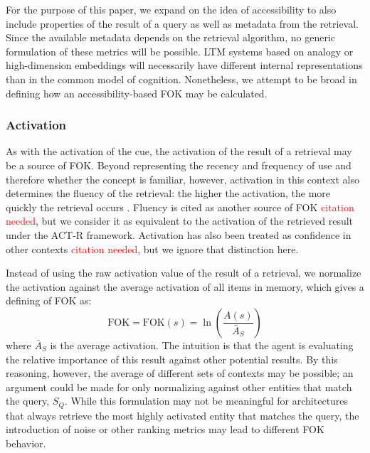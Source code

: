 \documentclass[10pt,letterpaper]{article}
\newcommand{\fixme}[2][]{#2}
\renewcommand{\fixme}[2][]{\textcolor{red}{#2}}
\newcommand{\fok}[0]{\text{FOK}}
\begin{document}
For the purpose of this paper, we expand on the idea of accessibility to also include properties of the result of a query as well as metadata from the retrieval.
Since the available metadata depends on the retrieval algorithm, no generic formulation of these metrics will be possible.
LTM systems based on analogy \cite{Forbus1995MACFACAModel} or high-dimension embeddings \cite{Kanerva1993SparseDistributedMemory} will necessarily have different internal representations than in the common model of cognition.
Nonetheless, we attempt to be broad in defining how an accessibility-based FOK may be calculated.

\subsubsection{Activation}

As with the activation of the cue, the activation of the result of a retrieval may be a source of FOK.
Beyond representing the recency and frequency of use and therefore whether the concept is familiar, however, activation in this context also determines the fluency of the retrieval: the higher the activation, the more quickly the retrieval occurs \cite{Anderson2004AnIntegratedTheory}.
Fluency is cited as another source of FOK \fixme{citation needed}, but we consider it as equivalent to the activation of the retrieved result under the ACT-R framework.
Activation has also been treated as confidence in other contexts \fixme{citation needed}, but we ignore that distinction here.

Instead of using the raw activation value of the result of a retrieval, we normalize the activation against the average activation of all items in memory, which gives a defining of FOK as:
$$\fok = \fok(s) = \ln(\frac{A(s)}{\bar{A}_S})$$
where $\bar{A}_S$ is the average activation. %
The intuition is that the agent is evaluating the relative importance of this result against other potential results.
By this reasoning, however, the average of different sets of contexts may be possible; an argument could be made for only normalizing against other entities that match the query, $S_Q$.
While this formulation may not be meaningful for architectures that always retrieve the most highly activated entity that matches the query, the introduction of noise or other ranking metrics may lead to different FOK behavior.

% 
% 
\end{document}
